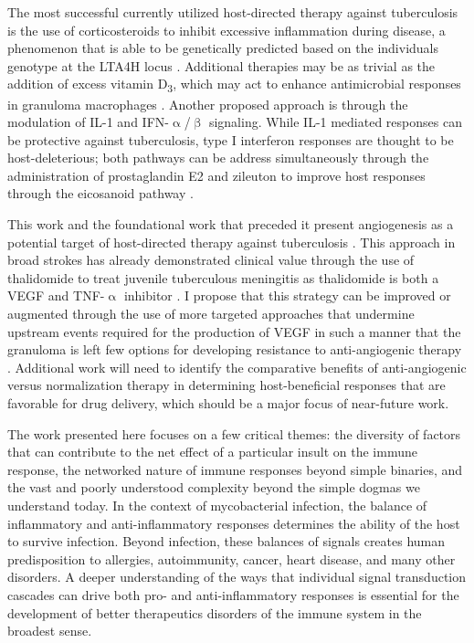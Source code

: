 The most successful currently utilized host\hyp{}directed therapy against tuberculosis is the use of corticosteroids to inhibit excessive inflammation during disease, a phenomenon that is able to be genetically predicted based on the individuals genotype at the LTA4H locus \citep{Tobin2012, Tobin2015}. Additional therapies may be as trivial as the addition of excess vitamin D\textsubscript{3}, which may act to enhance antimicrobial responses in granuloma macrophages \citep{Tobin2015}. Another proposed approach is through the modulation of IL\hyp{}1 and IFN\hyp{}$\upalpha$/$\upbeta$ signaling. While IL\hyp{}1 mediated responses can be protective against tuberculosis, type I interferon responses are thought to be host\hyp{}deleterious; both pathways can be address simultaneously through the administration of prostaglandin E2 and zileuton to improve host responses through the eicosanoid pathway \citep{MayerBarber2014, Kaufmann2014}.

This work and the foundational work that preceded it present angiogenesis as a potential target of host\hyp{}directed therapy against tuberculosis \citep{Oehlers2015, Datta2015, Oehlers2017, Polena2016, Walton2018}. This approach in broad strokes has already demonstrated clinical value through the use of thalidomide to treat juvenile tuberculous meningitis as thalidomide is both a VEGF and TNF\hyp{}$\upalpha$ inhibitor \citep{Kaufmann2014, vanToorn2021}. I propose that this strategy can be improved or augmented through the use of more targeted approaches that undermine upstream events required for the production of VEGF in such a manner that the granuloma is left few options for developing resistance to anti\hyp{}angiogenic therapy \citep{Kiran2016}. Additional work will need to identify the comparative benefits of anti\hyp{}angiogenic versus normalization therapy in determining host\hyp{}beneficial responses that are favorable for drug delivery, which should be a major focus of near\hyp{}future work.

The work presented here focuses on a few critical themes: the diversity of factors that can contribute to the net effect of a particular insult on the immune response, the networked nature of immune responses beyond simple binaries, and the vast and poorly understood complexity beyond the simple dogmas we understand today. In the context of mycobacterial infection, the balance of inflammatory and anti\hyp{}inflammatory responses determines the ability of the host to survive infection. Beyond infection, these balances of signals creates human predisposition to allergies, autoimmunity, cancer, heart disease, and many other disorders. A deeper understanding of the ways that individual signal transduction cascades can drive both pro\hyp{} and anti\hyp{}inflammatory responses is essential for the development of better therapeutics disorders of the immune system in the broadest sense.

